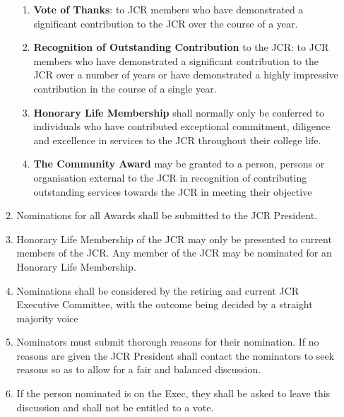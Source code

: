 \begin{enumerate}
\begin{enumerate}
\begin{enumerate}
            \item \textbf{Vote of Thanks}: to JCR members who have demonstrated a significant contribution
            to the JCR over the course of a year.
            \item \textbf{Recognition of Outstanding Contribution} to the JCR: to JCR members who have
            demonstrated a significant contribution to the JCR over a number of years or have
            demonstrated a highly impressive contribution in the course of a single year.
            \item \textbf{Honorary Life Membership} shall normally only be conferred to individuals who have
            contributed exceptional commitment, diligence and excellence in services to the JCR
            throughout their college life.
            \item \textbf{The Community Award} may be granted to a person, persons or organisation external
            to the JCR in recognition of contributing outstanding services towards the JCR in
            meeting their objective
        \end{enumerate}
        \item Nominations for all Awards shall be submitted to the JCR President.
        \item Honorary Life Membership of the JCR may only be presented to current members of the JCR. Any
        member of the JCR may be nominated for an Honorary Life Membership.
        \item Nominations shall be considered by the retiring and current JCR Executive Committee, with the
        outcome being decided by a straight majority voice
        \item Nominators must submit thorough reasons for their nomination. If no reasons are given the JCR
        President shall contact the nominators to seek reasons so as to allow for a fair and balanced
        discussion.
        \item If the person nominated is on the Exec, they shall be asked to leave this discussion and shall not
        be entitled to a vote.
    \end{enumerate}
\end{enumerate}
\label{sc: JCR Meetings}
